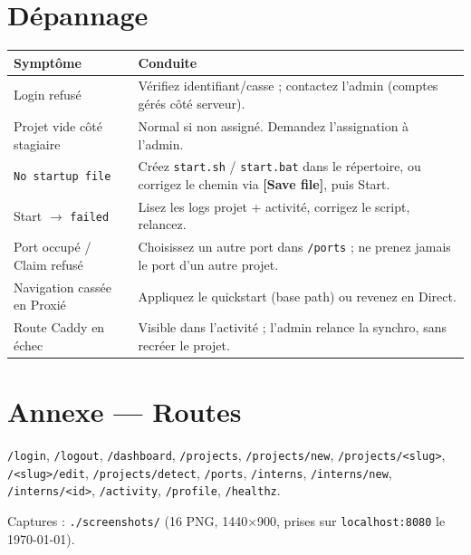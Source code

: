 \documentclass[11pt,a4paper]{article}
\newcommand{\chemin}[1]{\texttt{#1}}
\newcommand{\bouton}[1]{\textbf{[#1]}}
\begin{document}
\section{Dépannage}
\begin{longtable}{p{4cm}p{10cm}}
  \hline
  \textbf{Symptôme} & \textbf{Conduite} \\ \hline
  Login refusé & Vérifiez identifiant/casse ; contactez l'admin (comptes gérés côté serveur). \\ \hline
  Projet vide côté stagiaire & Normal si non assigné. Demandez l'assignation à l'admin. \\ \hline
  \texttt{No startup file} & Créez \chemin{start.sh} / \chemin{start.bat} dans le répertoire, ou corrigez le chemin via \bouton{Save file}, puis Start. \\ \hline
  Start $\rightarrow$ \texttt{failed} & Lisez les logs projet + activité, corrigez le script, relancez. \\ \hline
  Port occupé / Claim refusé & Choisissez un autre port dans \chemin{/ports} ; ne prenez jamais le port d'un autre projet. \\ \hline
  Navigation cassée en Proxié & Appliquez le quickstart (base path) ou revenez en Direct. \\ \hline
  Route Caddy en échec & Visible dans l'activité ; l'admin relance la synchro, sans recréer le projet. \\ \hline
\end{longtable}

\section*{Annexe — Routes}
\chemin{/login}, \chemin{/logout}, \chemin{/dashboard}, \chemin{/projects}, \chemin{/projects/new}, \chemin{/projects/<slug>}, \chemin{/<slug>/edit}, \chemin{/projects/detect}, \chemin{/ports}, \chemin{/interns}, \chemin{/interns/new}, \chemin{/interns/<id>}, \chemin{/activity}, \chemin{/profile}, \chemin{/healthz}.

Captures : \chemin{./screenshots/} (16 PNG, 1440$\times$900, prises sur \chemin{localhost:8080} le \today).
\end{document}
